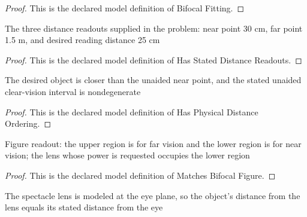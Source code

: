 \begin{proof}
  This is the declared model definition of Bifocal Fitting.
\end{proof}
\begin{definition}
  \label{def:physics:phyx-mini-0029:phyxminiproblems-problemphyxmini0029-hasstateddistancereadouts}
  The three distance readouts supplied in the problem: near point 30 cm, far point 1.5 m, and desired reading distance 25 cm
\end{definition}
\begin{proof}
  This is the declared model definition of Has Stated Distance Readouts.
\end{proof}
\begin{definition}
  \label{def:physics:phyx-mini-0029:phyxminiproblems-problemphyxmini0029-hasphysicaldistanceordering}
  The desired object is closer than the unaided near point, and the stated unaided clear-vision interval is nondegenerate
\end{definition}
\begin{proof}
  This is the declared model definition of Has Physical Distance Ordering.
\end{proof}
\begin{definition}
  \label{def:physics:phyx-mini-0029:phyxminiproblems-problemphyxmini0029-matchesbifocalfigure}
  Figure readout: the upper region is for far vision and the lower region is for near vision; the lens whose power is requested occupies the lower region
\end{definition}
\begin{proof}
  This is the declared model definition of Matches Bifocal Figure.
\end{proof}
\begin{definition}
  \label{def:physics:phyx-mini-0029:phyxminiproblems-problemphyxmini0029-useseyeplanelensapproximation}
  The spectacle lens is modeled at the eye plane, so the object's distance from the lens equals its stated distance from the eye
\end{definition}
